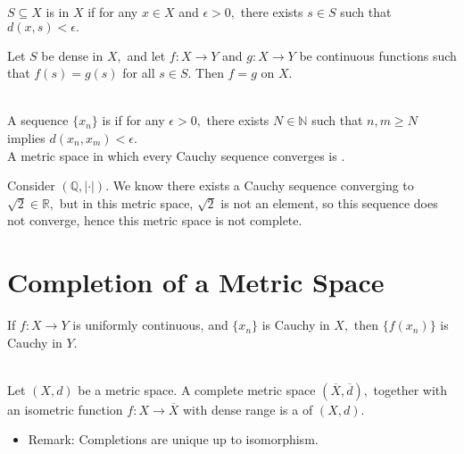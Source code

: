 \begin{defn}
$S\subseteq X$ is  in $X$ if for any $x\in X$ and $\epsilon>0,$ there exists $s\in S$ such that $d(x,s)<\epsilon.$
\end{defn}

\begin{prop}
Let $S$ be dense in $X,$ and let $f:X\rightarrow Y$ and $g:X\rightarrow Y$ be continuous functions such that $f(s)=g(s)$ for all $s\in S.$ Then $f=g$ on $X.$ \\ \\
\end{prop}

\begin{defn}
A sequence $\{x_n\}$ is  if for any $\epsilon>0,$ there exists $N\in\mathbb{N}$ such that $n,m\geq N$ implies $d(x_n,x_m)<\epsilon.$ \\
A metric space in which every Cauchy sequence converges is .
\end{defn}

\noindent\Ex Consider $(\mathbb{Q}, |\cdot|).$ We know there exists a Cauchy sequence converging to $\sqrt{2}\in\mathbb{R},$ but in this metric space, $\sqrt{2}$ is not an element, so this sequence does not converge, hence this metric space is not complete.

\section{Completion of a Metric Space}

\begin{prop}
If $f:X\rightarrow Y$ is uniformly continuous, and $\{x_n\}$ is Cauchy in $X,$ then $\{f(x_n)\}$ is Cauchy in $Y.$ \\ \\
\end{prop}

\begin{defn}
Let $(X,d)$ be a metric space. A complete metric space $(\overline{X},\overline{d}),$ together with an isometric function $f:X\rightarrow\overline{X}$ with dense range is a  of $(X,d).$
\end{defn}
\begin{itemize}
\item Remark: Completions are unique up to isomorphism.
\end{itemize}


